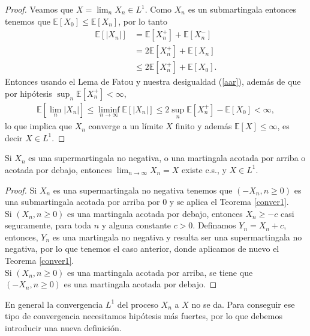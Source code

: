 \begin{proof}
Veamos que $X = \lim_n X_n \in L^1$. Como $X_n$ es un submartingala entonces tenemos que $\mathbb{E}[X_0] \leq \mathbb{E}[X_n]$, por lo tanto
	\begin{align}
	\mathbb{E}[|X_n|] & = \mathbb{E}[X_n^{+}] + \mathbb{E}[X_n^{-}] \nonumber \\
	& = 2\mathbb{E}[X_n^{+}] + \mathbb{E}[X_n] \nonumber \\
	& \leq 2\mathbb{E}[X_n^{+}] + \mathbb{E}[X_0]. \label{aar}
	\end{align}
Entonces usando el Lema de Fatou \cite[p.~205]{jacodprotter} y nuestra desigualdad (\ref{aar}), además de que por hipótesis $\sup_n \mathbb{E}[X_n^{+}] < \infty$,
	\begin{align*}
	\mathbb{E}\left[\lim_n |X_n|\right] \leq \liminf_{n \rightarrow \infty} \mathbb{E}[|X_n|] \leq 2 \sup_n \mathbb{E}[X_n^{+}] - \mathbb{E}[X_0] < \infty,
	\end{align*}
lo que implica que $X_n$ converge a un límite $X$ finito y además $\mathbb{E}[X] \leq \infty$, es decir $X \in L^1$.
\end{proof}

\begin{corollary}
Si $X_n$ es una supermartingala no negativa, o una martingala acotada por arriba o acotada por debajo, entonces $\lim_{n \rightarrow \infty} X_n = X$ existe c.s., y $X \in L^1$.
\end{corollary}
\begin{proof}
Si $X_n$ es una supermartingala no negativa tenemos que $(-X_n, n \geq 0)$ es una submartingala acotada por arriba por 0 y se aplica el Teorema \ref{conver1}. \\

Si $(X_n, n \geq 0)$ es una martingala acotada por debajo, entonces $X_n \geq -c$ casi seguramente, para toda $n$ y alguna constante $c > 0$. Definamos $Y_n = X_n + c$, entonces, $Y_n$ es una martingala no negativa y resulta ser una supermartingala no negativa, por lo que tenemos el caso anterior, donde aplicamos de nuevo el Teorema \ref{conver1}. \\

Si $(X_n, n \geq 0)$ es una martingala acotada por arriba, se tiene que $(-X_n, n \geq 0)$ es una martingala acotada por debajo.
\end{proof}

En general la convergencia $L^1$ del proceso $X_n$ a $X$ no se da. Para conseguir ese tipo de convergencia necesitamos hipótesis más fuertes, por lo que debemos introducir una nueva definición.

